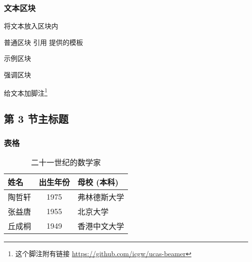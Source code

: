 \documentclass[10pt]{beamer}
\begin{document}
\begin{frame}[t]
  \frametitle{文本区块}
  将文本放入区块内
  \begin{block}{普通区块}
    引用 \autocite{guowei2019ucasbeamer} 提供的模板
  \end{block}
  \begin{exampleblock}{示例区块}
  \end{exampleblock}
  \begin{alertblock}{强调区块}
  \end{alertblock}
  给文本加脚注\footnote{这个脚注附有链接 \url{https://github.com/icgw/ucas-beamer}}
\end{frame}


\subsection[第 3 节缩写标题]{第 3 节主标题}\label{subsec:1-3}

\begin{frame}[t]
  \frametitle{表格}
  \begin{table}
    \begin{tabular}{lcl}\toprule
      姓名   & 出生年份 & 母校 (本科)  \\ \midrule
      陶哲轩 & 1975     & 弗林德斯大学 \\
      张益唐 & 1955     & 北京大学     \\
      丘成桐 & 1949     & 香港中文大学 \\ \bottomrule
    \end{tabular}
    \caption{二十一世纪的数学家}
  \end{table}
\end{frame}
\end{document}
